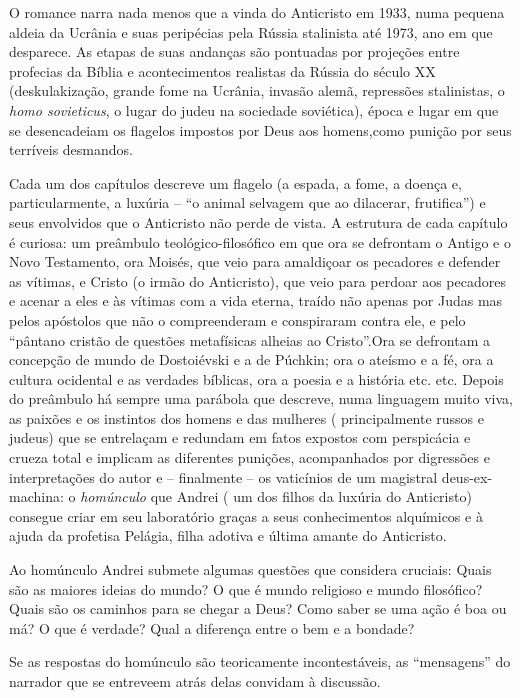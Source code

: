 O romance narra nada menos que a vinda do Anticristo em 1933, numa
pequena aldeia da Ucrânia e suas peripécias pela Rússia stalinista até
1973, ano em que desparece. As etapas de suas andanças são pontuadas por
projeções entre profecias da Bíblia e acontecimentos realistas da Rússia
do século XX (deskulakização, grande fome na Ucrânia, invasão alemã,
repressões stalinistas, o \emph{homo sovieticus}, o lugar do judeu na
sociedade soviética), época e lugar em que se desencadeiam os flagelos
impostos por Deus aos homens,como punição por seus terríveis desmandos.

Cada um dos capítulos descreve um flagelo (a espada, a fome, a doença e,
particularmente, a luxúria -- ``o animal selvagem que ao dilacerar,
frutifica'') e seus envolvidos que o Anticristo não perde de vista. A
estrutura de cada capítulo é curiosa: um preâmbulo teológico-filosófico
em que ora se defrontam o Antigo e o Novo Testamento, ora Moisés, que
veio para amaldiçoar os pecadores e defender as vítimas, e Cristo (o
irmão do Anticristo), que veio para perdoar aos pecadores e acenar a
eles e às vítimas com a vida eterna, traído não apenas por Judas mas
pelos apóstolos que não o compreenderam e conspiraram contra ele, e pelo
``pântano cristão de questões metafísicas alheias ao Cristo''.Ora se
defrontam a concepção de mundo de Dostoiévski e a de Púchkin; ora o
ateísmo e a fé, ora a cultura ocidental e as verdades bíblicas, ora a
poesia e a história etc. etc. Depois do preâmbulo há sempre uma parábola
que descreve, numa linguagem muito viva, as paixões e os instintos dos
homens e das mulheres ( principalmente russos e judeus) que se
entrelaçam e redundam em fatos expostos com perspicácia e crueza total e
implicam as diferentes punições, acompanhados por digressões e
interpretações do autor e -- finalmente -- os vaticínios de um magistral
deus-ex-machina: o \emph{homúnculo} que Andrei ( um dos filhos da
luxúria do Anticristo) consegue criar em seu laboratório graças a seus
conhecimentos alquímicos e à ajuda da profetisa Pelágia, filha adotiva e
última amante do Anticristo.

Ao homúnculo Andrei submete algumas questões que considera cruciais:
Quais são as maiores ideias do mundo? O que é mundo religioso e mundo
filosófico? Quais são os caminhos para se chegar a Deus? Como saber se
uma ação é boa ou má? O que é verdade? Qual a diferença entre o bem e a
bondade?

Se as respostas do homúnculo são teoricamente incontestáveis, as
``mensagens'' do narrador que se entreveem atrás delas convidam à
discussão.

